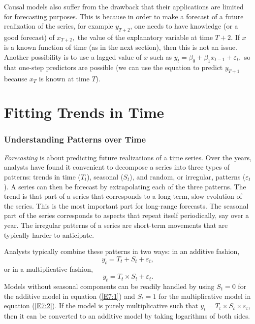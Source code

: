 
Causal models also suffer from the drawback that their applications
are limited for forecasting purposes. This is because in order to
make a forecast of a future realization of the series, for example
$y_{T+2}$, one needs to have knowledge (or a good forecast) of
$x_{T+2},$ the value of the explanatory variable at time $T+2$. If
$x$ is a known function of time (as in the next section), then this
is not an issue. Another possibility is to use a lagged value of $x$
such as $y_t = \beta_0 + \beta_1 x_{t-1} + \varepsilon_t,$ so that
one-step predictors are possible (we can use the equation to predict
$y_{T+1}$ because $x_T$ is known at time $T$).

\section{Fitting Trends in Time}\label{S7:Trends}

\subsubsection*{Understanding Patterns over Time}


\emph{Forecasting} is about predicting future realizations of a time
series. Over the years, analysts have found it convenient to
decompose a series into three types of patterns: trends in time
($T_t$), seasonal ($S_t$), and random, or irregular, patterns
($\varepsilon_t$). A series can then be forecast by extrapolating
each of the three patterns. The trend is that part of a series that
corresponds to a long-term, slow evolution of the series. This is
the most important part for long-range forecasts. The seasonal part
of the series corresponds to aspects that repeat itself
periodically, say over a year. The irregular patterns of a series
are short-term movements that are typically harder to
anticipate.

Analysts typically combine these patterns in two ways: in an
additive fashion,
\begin{equation}\label{E7:1}
y_t = T_t + S_t + \varepsilon_t,
\end{equation}
or in a multiplicative fashion,
\begin{equation}\label{E7:2}
y_t = T_t \times S_t + \varepsilon_t.
\end{equation}
Models without seasonal components can be readily handled by using
$S_t=0$ for the additive model in equation (\ref{E7:1}) and $S_t=1$
for the multiplicative model in equation (\ref{E7:2}). If the model
is purely multiplicative such that $y_t = T_t \times S_t \times
\varepsilon_t$, then it can be converted to an additive model by
taking logarithms of both sides.

